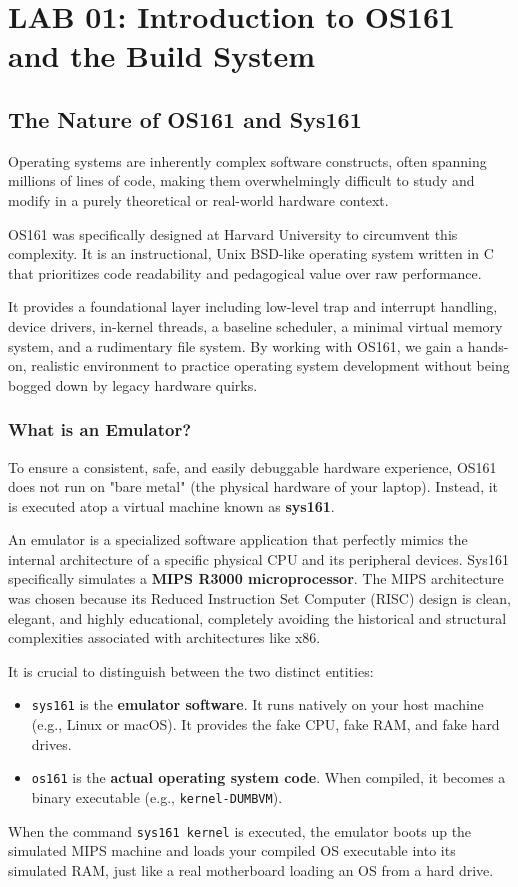 \chapter{LAB 01: Introduction to OS161 and the Build System}

\section{The Nature of OS161 and Sys161}
Operating systems are inherently complex software constructs, often spanning millions of lines of code, making them overwhelmingly difficult to study and modify in a purely theoretical or real-world hardware context. 

OS161 was specifically designed at Harvard University to circumvent this complexity. It is an instructional, Unix BSD-like operating system written in C that prioritizes code readability and pedagogical value over raw performance. 

It provides a foundational layer including low-level trap and interrupt handling, device drivers, in-kernel threads, a baseline scheduler, a minimal virtual memory system, and a rudimentary file system. By working with OS161, we gain a hands-on, realistic environment to practice operating system development without being bogged down by legacy hardware quirks.

\subsection{What is an Emulator?}
To ensure a consistent, safe, and easily debuggable hardware experience, OS161 does not run on "bare metal" (the physical hardware of your laptop). Instead, it is executed atop a virtual machine known as \textbf{sys161}. 

An emulator is a specialized software application that perfectly mimics the internal architecture of a specific physical CPU and its peripheral devices. Sys161 specifically simulates a \textbf{MIPS R3000 microprocessor}. The MIPS architecture was chosen because its Reduced Instruction Set Computer (RISC) design is clean, elegant, and highly educational, completely avoiding the historical and structural complexities associated with architectures like x86. 

It is crucial to distinguish between the two distinct entities: 
\begin{itemize}
    \item \texttt{sys161} is the \textbf{emulator software}. It runs natively on your host machine (e.g., Linux or macOS). It provides the fake CPU, fake RAM, and fake hard drives.
    \item \texttt{os161} is the \textbf{actual operating system code}. When compiled, it becomes a binary executable (e.g., \texttt{kernel-DUMBVM}). 
\end{itemize}
When the command \texttt{sys161 kernel} is executed, the emulator boots up the simulated MIPS machine and loads your compiled OS executable into its simulated RAM, just like a real motherboard loading an OS from a hard drive.

